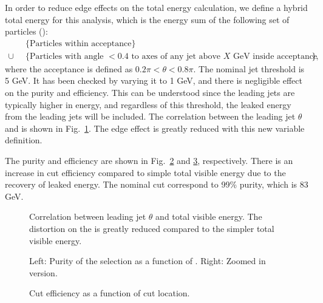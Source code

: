 In order to reduce edge effects on the total energy calculation, we define a hybrid total energy for this analysis, which is the energy sum of the following set of particles (\HybridE):
%
\begin{align}
    &\{\text{Particles within acceptance}\} \\\nonumber
    \cup \;\; &\{\text{Particles with angle $< 0.4$ to axes of any jet above $X$ GeV inside acceptance}\},
\end{align}
%
%
where the acceptance is defined as $0.2\pi < \theta < 0.8\pi$.  The nominal jet threshold is 5 GeV.  It has been checked by varying it to 1 GeV, and there is negligible effect on the purity and efficiency.  This can be understood since the leading jets are typically higher in energy, and regardless of this threshold, the leaked energy from the leading jets will be included.
The correlation between the leading jet $\theta$ and \HybridE is shown in Fig.~\ref{Figure:LeadingJet-HybridEJetTheta}.  The edge effect is greatly reduced with this new variable definition.

The purity and efficiency are shown in Fig.~\ref{Figure:LeadingJet-HybridEFraction} and \ref{Figure:LeadingJet-HybridEEfficiency}, respectively.  There is an increase in cut efficiency compared to simple total visible energy due to the recovery of leaked energy.  The nominal cut correspond to 99\% purity, which is 83 GeV.

\begin{figure}[htp!]
    \centering
    \caption{Correlation between leading jet $\theta$ and total visible energy.  The distortion on the \HybridE is greatly reduced compared to the simpler total visible energy.}
    \label{Figure:LeadingJet-HybridEJetTheta}
\end{figure}

\begin{figure}[htp!]
    \centering
    \caption{Left: Purity of the selection as a function of \HybridE.  Right: Zoomed in version.}
    \label{Figure:LeadingJet-HybridEFraction}
\end{figure}

\begin{figure}[htp!]
    \centering
    \caption{Cut efficiency as a function of \HybridE cut location.}
    \label{Figure:LeadingJet-HybridEEfficiency}
\end{figure}

